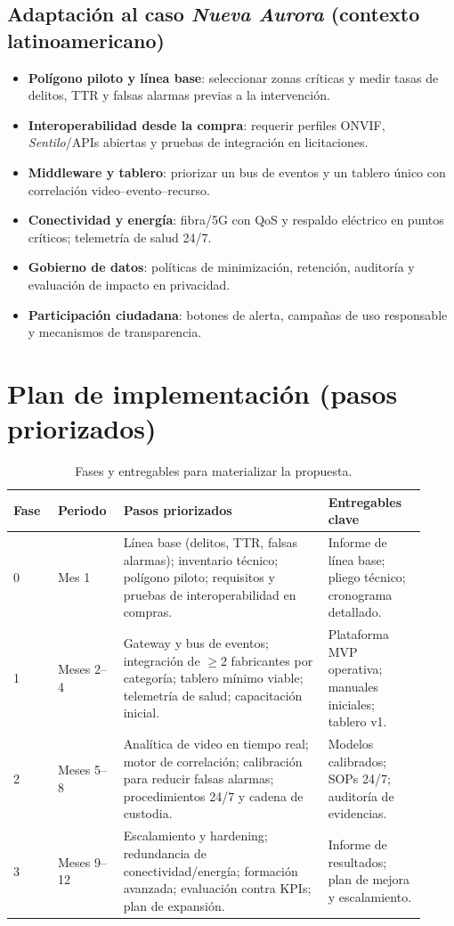 \documentclass[12pt,a4paper]{article}
\begin{document}
\subsection*{Adaptación al caso \textit{Nueva Aurora} (contexto latinoamericano)}
\begin{itemize}
  \item \textbf{Polígono piloto y línea base}: seleccionar zonas críticas y medir tasas de delitos, TTR y falsas alarmas previas a la intervención.
  \item \textbf{Interoperabilidad desde la compra}: requerir perfiles ONVIF, \textit{Sentilo}/APIs abiertas y pruebas de integración en licitaciones.
  \item \textbf{Middleware y tablero}: priorizar un bus de eventos y un tablero único con correlación video--evento--recurso.
  \item \textbf{Conectividad y energía}: fibra/5G con QoS y respaldo eléctrico en puntos críticos; telemetría de salud 24/7.
  \item \textbf{Gobierno de datos}: políticas de minimización, retención, auditoría y evaluación de impacto en privacidad.
  \item \textbf{Participación ciudadana}: botones de alerta, campañas de uso responsable y mecanismos de transparencia.
\end{itemize}


\newpage
\section{Plan de implementación (pasos priorizados)}

\begin{table}[htbp]
\centering
\caption{Fases y entregables para materializar la propuesta.}
\begin{tabular}{p{0.10\linewidth} p{0.14\linewidth} p{0.46\linewidth} p{0.22\linewidth}}
\hline
\textbf{Fase} & \textbf{Periodo} & \textbf{Pasos priorizados} & \textbf{Entregables clave} \\
\hline
0 & Mes 1 &
Línea base (delitos, TTR, falsas alarmas); inventario técnico; polígono piloto; requisitos y pruebas de interoperabilidad en compras. &
Informe de línea base; pliego técnico; cronograma detallado. \\
\hline
1 & Meses 2--4 &
Gateway y bus de eventos; integración de \(\geq\)2 fabricantes por categoría; tablero mínimo viable; telemetría de salud; capacitación inicial. &
Plataforma MVP operativa; manuales iniciales; tablero v1. \\
\hline
2 & Meses 5--8 &
Analítica de video en tiempo real; motor de correlación; calibración para reducir falsas alarmas; procedimientos 24/7 y cadena de custodia. &
Modelos calibrados; SOPs 24/7; auditoría de evidencias. \\
\hline
3 & Meses 9--12 &
Escalamiento y hardening; redundancia de conectividad/energía; formación avanzada; evaluación contra KPIs; plan de expansión. &
Informe de resultados; plan de mejora y escalamiento. \\
\hline
\end{tabular}
\end{table}
\end{document}

